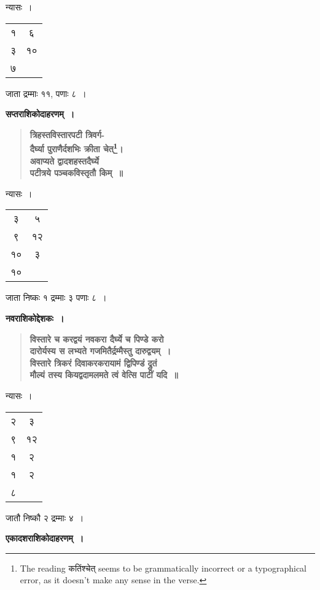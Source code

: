 \documentclass[11pt, openany]{book}
\begin{document}
न्यासः~। \begin{tabular}{c|c}
१ & ६ \\
३ & १० \\
७ & 
\end{tabular} जाता द्रम्माः ११, पणाः ८~।

\newpage

\noindent \textbf{सप्तराशिकोदाहरणम्~।}

 \label{Ex 1.77}
\begin{quote}
\textbf{{\color{red}त्रिहस्तविस्तारपटी त्रिवर्ग-\\
दैर्घ्या पुराणैर्दशभिः क्रीता चेत्\renewcommand{\thefootnote}{$\star$}\footnote{The reading कतिंश्चेत् seems to be grammatically incorrect or a typographical error, as it doesn't make any sense in the verse.}।\\
अवाप्यते द्वादशहस्तदैर्घ्ये \\
पटीत्रये पञ्चकविस्तृतौ किम्~॥}}
\end{quote}

न्यासः~। \begin{tabular}{c|c}
३ & ५ \\
९ & १२ \\
१० & ३ \\
१० & 
\end{tabular} जाता निष्कः १ द्रम्माः ३ पणाः ८~।\\
\vspace{2mm}

\noindent \textbf{नवराशिकोद्देशकः~।}

 \label{Ex 1.78}
\begin{quote}
\textbf{{\color{red}विस्तारे च करद्वयं नवकरा दैर्घ्ये च पिण्डे करो\\
दारोर्यस्य स लभ्यते गजमितैर्द्रम्मैस्तु दारुद्वयम्~।\\
विस्तारे त्रिकरं दिवाकरकरायामं द्विपिण्डं द्रुतं\\
मौल्यं तस्य कियद्वदामलमते त्वं वेत्सि पाटीं यदि~॥}}
\end{quote}

न्यासः~। \begin{tabular}{c|c}
२ & ३ \\
९ & १२ \\
१ & २ \\
१ & २ \\
८ & 
\end{tabular} जातौ निष्कौ २ द्रम्माः ४~।\\
\vspace{2mm}

\noindent \textbf{एकादशराशिकोदाहरणम्~।}
\end{document}
